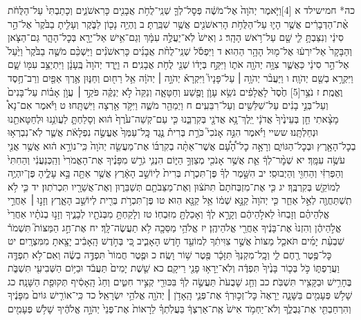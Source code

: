 \documentclass[twoside, openany, parskip=half, 11pt]{book}
\begin{document}
כה* חמישילד א ‏[4]וַיֹּ֤אמֶר יְהֹוָה֙ אֶל־מֹשֶׁ֔ה פְּסׇל־לְךָ֛ שְׁנֵֽי־לֻחֹ֥ת אֲבָנִ֖ים כָּרִאשֹׁנִ֑ים וְכָתַבְתִּי֙ עַל־הַלֻּחֹ֔ת אֶ֨ת־הַדְּבָרִ֔ים אֲשֶׁ֥ר הָי֛וּ עַל־הַלֻּחֹ֥ת הָרִאשֹׁנִ֖ים אֲשֶׁ֥ר שִׁבַּֽרְתָּ׃ ב וֶהְיֵ֥ה נָכ֖וֹן לַבֹּ֑קֶר וְעָלִ֤יתָ בַבֹּ֙קֶר֙ אֶל־הַ֣ר סִינַ֔י וְנִצַּבְתָּ֥ לִ֛י שָׁ֖ם עַל־רֹ֥אשׁ הָהָֽר׃ ג וְאִישׁ֙ לֹֽא־יַעֲלֶ֣ה עִמָּ֔ךְ וְגַם־אִ֥ישׁ אַל־יֵרָ֖א בְּכׇל־הָהָ֑ר גַּם־הַצֹּ֤אן וְהַבָּקָר֙ אַל־יִרְע֔וּ אֶל־מ֖וּל הָהָ֥ר הַהֽוּא׃ ד וַיִּפְסֹ֡ל שְׁנֵֽי־לֻחֹ֨ת אֲבָנִ֜ים כָּרִאשֹׁנִ֗ים וַיַּשְׁכֵּ֨ם מֹשֶׁ֤ה בַבֹּ֙קֶר֙ וַיַּ֙עַל֙ אֶל־הַ֣ר סִינַ֔י כַּאֲשֶׁ֛ר צִוָּ֥ה יְהֹוָ֖ה אֹת֑וֹ וַיִּקַּ֣ח בְּיָד֔וֹ שְׁנֵ֖י לֻחֹ֥ת אֲבָנִֽים׃ ה וַיֵּ֤רֶד יְהֹוָה֙ בֶּֽעָנָ֔ן וַיִּתְיַצֵּ֥ב עִמּ֖וֹ שָׁ֑ם וַיִּקְרָ֥א בְשֵׁ֖ם יְהֹוָֽה׃ ו וַיַּעֲבֹ֨ר יְהֹוָ֥ה ׀ עַל־פָּנָיו֮ וַיִּקְרָא֒ יְהֹוָ֣ה ׀ יְהֹוָ֔ה אֵ֥ל רַח֖וּם וְחַנּ֑וּן אֶ֥רֶךְ אַפַּ֖יִם וְרַב־חֶ֥סֶד וֶאֱמֶֽת׃ ז נֹצֵ֥ר‏[5] חֶ֙סֶד֙ לָאֲלָפִ֔ים נֹשֵׂ֥א עָוֺ֛ן וָפֶ֖שַׁע וְחַטָּאָ֑ה וְנַקֵּה֙ לֹ֣א יְנַקֶּ֔ה פֹּקֵ֣ד ׀ עֲוֺ֣ן אָב֗וֹת עַל־בָּנִים֙ וְעַל־בְּנֵ֣י בָנִ֔ים עַל־שִׁלֵּשִׁ֖ים וְעַל־רִבֵּעִֽים׃ ח וַיְמַהֵ֖ר מֹשֶׁ֑ה וַיִּקֹּ֥ד אַ֖רְצָה וַיִּשְׁתָּֽחוּ׃ ט וַיֹּ֡אמֶר אִם־נָא֩ מָצָ֨אתִי חֵ֤ן בְּעֵינֶ֙יךָ֙ אֲדֹנָ֔י יֵֽלֶךְ־נָ֥א אֲדֹנָ֖י בְּקִרְבֵּ֑נוּ כִּ֤י עַם־קְשֵׁה־עֹ֙רֶף֙ ה֔וּא וְסָלַחְתָּ֛ לַעֲוֺנֵ֥נוּ וּלְחַטָּאתֵ֖נוּ וּנְחַלְתָּֽנוּ׃ ששיי וַיֹּ֗אמֶר הִנֵּ֣ה אָנֹכִי֮ כֹּרֵ֣ת בְּרִית֒ נֶ֤גֶד כׇּֽל־עַמְּךָ֙ אֶעֱשֶׂ֣ה נִפְלָאֹ֔ת אֲשֶׁ֛ר לֹֽא־נִבְרְא֥וּ בְכׇל־הָאָ֖רֶץ וּבְכׇל־הַגּוֹיִ֑ם וְרָאָ֣ה כׇל־הָ֠עָ֠ם אֲשֶׁר־אַתָּ֨ה בְקִרְבּ֜וֹ אֶת־מַעֲשֵׂ֤ה יְהֹוָה֙ כִּֽי־נוֹרָ֣א ה֔וּא אֲשֶׁ֥ר אֲנִ֖י עֹשֶׂ֥ה עִמָּֽךְ׃ יא שְׁמׇ֨ר־לְךָ֔ אֵ֛ת אֲשֶׁ֥ר אָנֹכִ֖י מְצַוְּךָ֣ הַיּ֑וֹם הִנְנִ֧י גֹרֵ֣שׁ מִפָּנֶ֗יךָ אֶת־הָאֱמֹרִי֙ וְהַֽכְּנַעֲנִ֔י וְהַחִתִּי֙ וְהַפְּרִזִּ֔י וְהַחִוִּ֖י וְהַיְבוּסִֽי׃ יב הִשָּׁ֣מֶר לְךָ֗ פֶּן־תִּכְרֹ֤ת בְּרִית֙ לְיוֹשֵׁ֣ב הָאָ֔רֶץ אֲשֶׁ֥ר אַתָּ֖ה בָּ֣א עָלֶ֑יהָ פֶּן־יִהְיֶ֥ה לְמוֹקֵ֖שׁ בְּקִרְבֶּֽךָ׃ יג כִּ֤י אֶת־מִזְבְּחֹתָם֙ תִּתֹּצ֔וּן וְאֶת־מַצֵּבֹתָ֖ם תְּשַׁבֵּר֑וּן וְאֶת־אֲשֵׁרָ֖יו תִּכְרֹתֽוּן׃ יד כִּ֛י לֹ֥א תִֽשְׁתַּחֲוֶ֖ה לְאֵ֣ל אַחֵ֑ר כִּ֤י יְהֹוָה֙ קַנָּ֣א שְׁמ֔וֹ אֵ֥ל קַנָּ֖א הֽוּא׃ טו פֶּן־תִּכְרֹ֥ת בְּרִ֖ית לְיוֹשֵׁ֣ב הָאָ֑רֶץ וְזָנ֣וּ ׀ אַחֲרֵ֣י אֱלֹֽהֵיהֶ֗ם וְזָבְחוּ֙ לֵאלֹ֣הֵיהֶ֔ם וְקָרָ֣א לְךָ֔ וְאָכַלְתָּ֖ מִזִּבְחֽוֹ׃ טז וְלָקַחְתָּ֥ מִבְּנֹתָ֖יו לְבָנֶ֑יךָ וְזָנ֣וּ בְנֹתָ֗יו אַחֲרֵי֙ אֱלֹ֣הֵיהֶ֔ן וְהִזְנוּ֙ אֶת־בָּנֶ֔יךָ אַחֲרֵ֖י אֱלֹהֵיהֶֽן׃ יז אֱלֹהֵ֥י מַסֵּכָ֖ה לֹ֥א תַעֲשֶׂה־לָּֽךְ׃ יח אֶת־חַ֣ג הַמַּצּוֹת֮ תִּשְׁמֹר֒ שִׁבְעַ֨ת יָמִ֜ים תֹּאכַ֤ל מַצּוֹת֙ אֲשֶׁ֣ר צִוִּיתִ֔ךָ לְמוֹעֵ֖ד חֹ֣דֶשׁ הָאָבִ֑יב כִּ֚י בְּחֹ֣דֶשׁ הָֽאָבִ֔יב יָצָ֖אתָ מִמִּצְרָֽיִם׃ יט כׇּל־פֶּ֥טֶר רֶ֖חֶם לִ֑י וְכׇֽל־מִקְנְךָ֙ תִּזָּכָ֔ר פֶּ֖טֶר שׁ֥וֹר וָשֶֽׂה׃ כ וּפֶ֤טֶר חֲמוֹר֙ תִּפְדֶּ֣ה בְשֶׂ֔ה וְאִם־לֹ֥א תִפְדֶּ֖ה וַעֲרַפְתּ֑וֹ כֹּ֣ל בְּכ֤וֹר בָּנֶ֙יךָ֙ תִּפְדֶּ֔ה וְלֹֽא־יֵרָא֥וּ פָנַ֖י רֵיקָֽם׃ כא שֵׁ֤שֶׁת יָמִים֙ תַּעֲבֹ֔ד וּבַיּ֥וֹם הַשְּׁבִיעִ֖י תִּשְׁבֹּ֑ת בֶּחָרִ֥ישׁ וּבַקָּצִ֖יר תִּשְׁבֹּֽת׃ כב וְחַ֤ג שָׁבֻעֹת֙ תַּעֲשֶׂ֣ה לְךָ֔ בִּכּוּרֵ֖י קְצִ֣יר חִטִּ֑ים וְחַג֙ הָֽאָסִ֔יף תְּקוּפַ֖ת הַשָּׁנָֽה׃ כג שָׁלֹ֥שׁ פְּעָמִ֖ים בַּשָּׁנָ֑ה יֵרָאֶה֙ כׇּל־זְכ֣וּרְךָ֔ אֶת־פְּנֵ֛י הָֽאָדֹ֥ן ׀ יְהֹוָ֖ה אֱלֹהֵ֥י יִשְׂרָאֵֽל׃ כד כִּֽי־אוֹרִ֤ישׁ גּוֹיִם֙ מִפָּנֶ֔יךָ וְהִרְחַבְתִּ֖י אֶת־גְּבֻלֶ֑ךָ וְלֹא־יַחְמֹ֥ד אִישׁ֙ אֶֽת־אַרְצְךָ֔ בַּעֲלֹֽתְךָ֗ לֵרָאוֹת֙ אֶת־פְּנֵי֙ יְהֹוָ֣ה אֱלֹהֶ֔יךָ שָׁלֹ֥שׁ פְּעָמִ֖ים 
\end{document}
